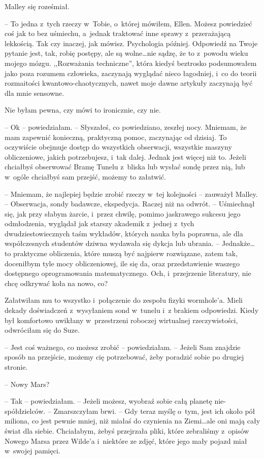 \documentclass[oneside,polish,11pt,sfheadings]{mwbk}
\begin{document}
Malley się roześmiał. 

-- To jedna z~tych rzeczy w~Tobie, o~której
mówiłem, Ellen. Możesz powiedzieć coś jak to bez uśmiechu, a~jednak
traktować inne sprawy z~przerażającą lekkością. Tak czy inaczej, jak
mówisz. Psychologia później. Odpowiedź na Twoje pytanie jest, tak, robię
postępy, ale są wolne\ldots  nie sądzę, że to z~powodu wieku mojego mózgu.
,,Rozważania techniczne'', która kiedyś beztrosko podsumowałem jako poza
rozumem człowieka, zaczynają wyglądać nieco łagodniej, i~co do teorii
rozmaitości kwantowo-chaotycznych, nawet moje dawne artykuły zaczynają
być dla mnie sensowne.

Nie byłam pewna, czy mówi to ironicznie, czy nie.

-- Ok -- powiedziałam. -- Słyszałeś, co powiedziano, zeszłej nocy. Mniemam,
że mam zapewnić konieczną, praktyczną pomoc, zaczynając od dzisiaj. To
oczywiście obejmuje dostęp do wszystkich obserwacji, wszystkie maszyny
obliczeniowe, jakich potrzebujesz, i~tak dalej. Jednak jest więcej niż
to. Jeżeli chciałbyś obserwować Bramę Tunelu z~bliska lub wysłać sondę
przez nią, lub w~ogóle chciałbyś sam przejść, możemy to załatwić.

-- Mniemam, że najlepiej będzie zrobić rzeczy w~tej kolejności -- zauważył
Malley. -- Obserwacja, sondy badawcze, ekspedycja. Raczej niż na odwrót.
-- Uśmiechnął się, jak przy słabym żarcie, i~przez chwilę, pomimo
jaskrawego sukcesu jego odmłodzenia, wyglądał jak starszy akademik z~jednej z~tych dwudziestowiecznych taśm wykładów, których nauka była
poprawna, ale dla współczesnych studentów dziwna wydawała się dykcja lub
ubrania. -- Jednakże\ldots  to praktyczne obliczenia, które muszą być
najpierw rozwiązane, zatem tak, doceniłbym tyle mocy obliczeniowej, ile
się da, oraz przedstawienie waszego dostępnego oprogramowania
matematycznego. Och, i~przejrzenie literatury, nie chcę odkrywać koła na
nowo, co?

Załatwiłam mu to wszystko i~połączenie do zespołu fizyki wormhole'a.
Mieli dekady doświadczeń z~wysyłaniem sond w~tunelu i~z brakiem
odpowiedzi. Kiedy był komfortowo uwikłany w~przestrzeni roboczej
wirtualnej rzeczywistości, odwróciłam się do Suze.

-- Jest coś ważnego, co możesz zrobić -- powiedziałam. -- Jeżeli Sam
znajdzie sposób na przejście, możemy cię potrzebować, żeby poradzić
sobie po drugiej stronie.

-- Nowy Mars?

-- Tak -- powiedziałam. -- Jeżeli możesz, wyobraź sobie całą planetę
nie-spółdzielców. -- Zmarszczyłam brwi. -- Gdy teraz myślę o~tym, jest ich
około pół miliona, co jest pewnie mniej, niż miałaś do czynienia na
Ziemi\ldots  ale oni mają cały świat dla siebie. Chciałabym, żebyś
przejrzała pliki, które zebraliśmy z~opisów Nowego Marsa przez Wilde'a i~niektóre ze zdjęć, które jego mały pojazd miał w~swojej pamięci.
\end{document}
